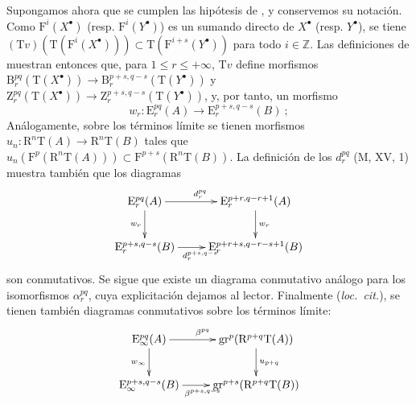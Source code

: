 \begin{env}[13.6.5]
\label{0.13.6.5}
\label{0.13.6.5-fr}
Supongamos ahora que se cumplen las hipótesis de , y
conservemos su notación.
Como $\mathrm F^i(X^\bullet)$ (resp.
$\mathrm F^i(Y^\bullet)$) es un sumando directo de $X^\bullet$
(resp. $Y^\bullet$), se tiene
$(\mathrm T v)(\mathrm T(\mathrm F^i(X^\bullet)))
\subset\mathrm T(\mathrm F^{i+s}(Y^\bullet))$
para todo $i\in\mathbb Z$.
Las definiciones de  muestran entonces que, para
$1\leq r\leq+\infty$, $\mathrm T v$ define morfismos
$\mathrm B_r^{pq}(\mathrm T(X^\bullet))\to
\mathrm B_r^{p+s,q-s}(\mathrm T(Y^\bullet))$
y
$\mathrm Z_r^{pq}(\mathrm T(X^\bullet))\to
\mathrm Z_r^{p+s,q-s}(\mathrm T(Y^\bullet))$,
y, por tanto, un morfismo
\[
w_r:\mathrm E_r^{pq}(A)\to\mathrm E_r^{p+s,q-s}(B)~;
\]
Análogamente, sobre los términos límite se tienen morfismos
$u_n:\mathrm R^n\mathrm T(A)\to\mathrm R^n\mathrm T(B)$
tales que
$u_n(\mathrm F^p(\mathrm R^n\mathrm T(A)))\subset
\mathrm F^{p+s}(\mathrm R^n\mathrm T(B))$.
La definición de los $d_r^{pq}$ (M, XV, 1) muestra también que los
diagramas
\[
\xymatrix{
\mathrm E_r^{pq}(A)\ar[r]^{d_r^{pq}}\ar[d]_{w_r}
&\mathrm E_r^{p+r,q-r+1}(A)\ar[d]^{w_r}\\
\mathrm E_r^{p+s,q-s}(B)\ar[r]_{d_r^{p+s,q-s}}
&\mathrm E_r^{p+r+s,q-r-s+1}(B)
}
\]
son conmutativos.
Se sigue que existe un diagrama conmutativo análogo para los
isomorfismos $\alpha_r^{pq}$, cuya explicitación dejamos al lector.
Finalmente (\emph{loc.\ cit.}), se tienen también diagramas conmutativos
sobre los términos límite:
\[
\xymatrix{
\mathrm E_\infty^{pq}(A)\ar[r]^{\beta^{pq}}\ar[d]_{w_\infty}
&\operatorname{gr}^p(\mathrm R^{p+q}\mathrm T(A))
  \ar[d]^{u_{p+q}}\\
\mathrm E_\infty^{p+s,q-s}(B)\ar[r]_{\beta^{p+s,q-s}}
&\operatorname{gr}^{p+s}(\mathrm R^{p+q}\mathrm T(B))
}
\]
\end{env}


